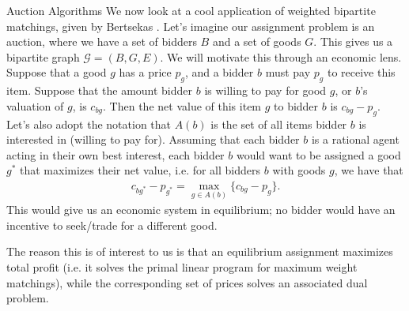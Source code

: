 \begin{section}{Auction Algorithms}
	We now look at a cool application of weighted bipartite matchings, given by Bertsekas 
	\cite{Bertsekas1992}. Let's imagine our assignment 
	problem is an auction, where we have a set of bidders $B$ and a set of goods $G$. This gives us 
	a bipartite graph $\mathcal{G} = (B,G,E)$. 
	We will motivate this through an economic lens. Suppose that a good $g$ 
	has a price $p_g$, and a bidder $b$ must pay $p_g$ to receive this item. Suppose that the 
	amount bidder $b$ is willing to pay for good $g$, or $b$'s valuation of $g$, is $c_{bg}$. 
	Then the net value 
	of this item $g$ to bidder $b$ is $c_{bg} - p_g$. Let's also adopt the notation that 
	$A(b)$ is the set of all items bidder $b$ is interested in (willing to pay for). 
	Assuming that each bidder $b$ is a rational agent acting 
	in their own best interest, each bidder $b$ would want to be assigned a good $g^{*}$ that 
	maximizes their net value, i.e. for all bidders $b$ with goods $g$, we have that 
	\begin{align}
		c_{bg^{*}} - p_{g^{*}} = \max_{g\in A(b)} \{c_{bg} - p_g \}.
	\end{align}
	This would give us an economic system in equilibrium; no bidder would have an incentive to 
	seek/trade for a different good.  

	The reason this is of interest to us is that an equilibrium assignment maximizes total 
	profit (i.e. it solves the primal linear program for maximum weight matchings), while the 
	corresponding set of prices solves an associated dual problem.


\end{section}
